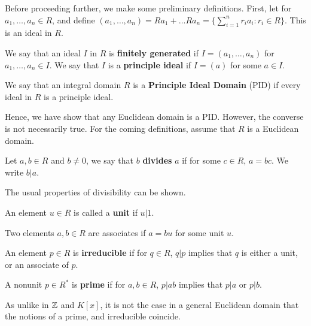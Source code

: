 Before proceeding further, we make some preliminary definitions. First, let for $a_1, \dots, a_n \in R$, and define $(a_1, \dots, a_n)=Ra_1+ \dots Ra_n=\{\sum_{i=1}^{n} r_ia_i:r_i \in R\}$. This is an ideal in $R$. 

\begin{definition}
    We say that an ideal $I$ in $R$ is \textbf{finitely generated} if $I=(a_1, \dots,a_n)$ for $a_1, \dots,a_n \in I$. We say that $I$ is a \textbf{principle ideal} if $I=(a)$ for some $a \in I$.
\end{definition}

\begin{definition}
    We say that an integral domain $R$ is a \textbf{Principle Ideal Domain} (PID) if every ideal in $R$ is a principle ideal.
\end{definition}

Hence, we have show that any Euclidean domain is a PID. However, the converse is not necessarily true. For the coming definitions, assume that $R$ is a Euclidean domain.

\begin{definition}
    Let $a,b \in R$ and $b \neq 0$, we say that $b$ \textbf{divides} $a$ if for some $c \in R$, $a=bc$. We write $b|a$.
\end{definition}

The usual properties of divisibility can be shown.

\begin{definition}
    An element $u \in R$ is called a \textbf{unit} if $u|1$.
\end{definition}

\begin{definition}
    Two elements $a,b \in R$ are associates if $a=bu$ for some unit $u$.
\end{definition}

\begin{definition}
    An element $p \in R$ is \textbf{irreducible} if for $q \in R$, $q|p$ implies that $q$ is either a unit, or an associate of $p$.
\end{definition}

\begin{definition}
    A nonunit $p \in R^*$ is \textbf{prime} if for $a,b \in R$, $p|ab$ implies that $p|a$ or $p|b$. 
\end{definition}

As unlike in $\mathbb{Z}$ and $K[x]$, it is not the case in a general Euclidean domain that the notions of a prime, and irreducible coincide.

